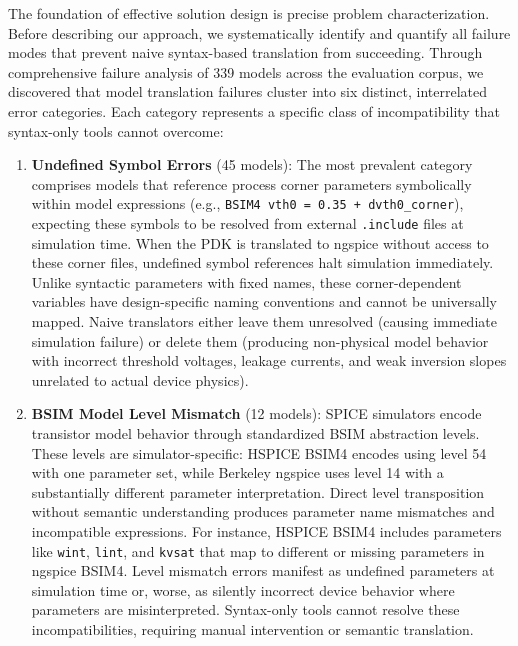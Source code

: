 \documentclass[conference]{IEEEtran}
\begin{document}
The foundation of effective solution design is precise problem characterization. Before describing our approach, we systematically identify and quantify all failure modes that prevent naive syntax-based translation from succeeding. Through comprehensive failure analysis of 339 models across the evaluation corpus, we discovered that model translation failures cluster into six distinct, interrelated error categories. Each category represents a specific class of incompatibility that syntax-only tools cannot overcome:

\begin{enumerate}
\item \textbf{Undefined Symbol Errors} (45 models): The most prevalent category comprises models that reference process corner parameters symbolically within model expressions (e.g., \texttt{BSIM4 vth0 = 0.35 + dvth0\_corner}), expecting these symbols to be resolved from external \texttt{.include} files at simulation time. When the PDK is translated to ngspice without access to these corner files, undefined symbol references halt simulation immediately. Unlike syntactic parameters with fixed names, these corner-dependent variables have design-specific naming conventions and cannot be universally mapped. Naive translators either leave them unresolved (causing immediate simulation failure) or delete them (producing non-physical model behavior with incorrect threshold voltages, leakage currents, and weak inversion slopes unrelated to actual device physics).

\item \textbf{BSIM Model Level Mismatch} (12 models): SPICE simulators encode transistor model behavior through standardized BSIM abstraction levels. These levels are simulator-specific: HSPICE BSIM4 encodes using level 54 with one parameter set, while Berkeley ngspice uses level 14 with a substantially different parameter interpretation. Direct level transposition without semantic understanding produces parameter name mismatches and incompatible expressions. For instance, HSPICE BSIM4 includes parameters like \texttt{wint}, \texttt{lint}, and \texttt{kvsat} that map to different or missing parameters in ngspice BSIM4. Level mismatch errors manifest as undefined parameters at simulation time or, worse, as silently incorrect device behavior where parameters are misinterpreted. Syntax-only tools cannot resolve these incompatibilities, requiring manual intervention or semantic translation.


\end{enumerate}
\end{document}
